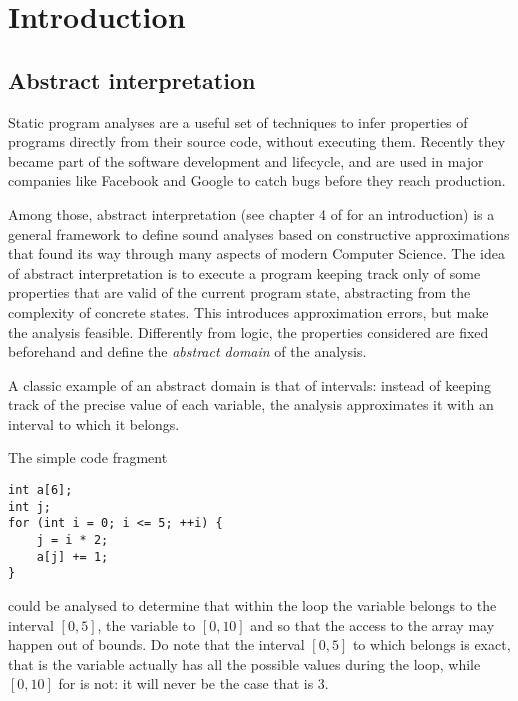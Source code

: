 \chapter{Introduction}

\section{Abstract interpretation}
Static program analyses are a useful set of techniques to infer properties of programs directly from their source code, without executing them. Recently they became part of the software development and lifecycle, and are used in major companies like Facebook \cite{distefano-static-analysis-fb} and Google \cite{static-analysis-google} to catch bugs before they reach production.

Among those, abstract interpretation \cite{cousot-77,cousot-79,cousot-92} (see chapter 4 of \cite{principles-of-program-analysis-book} for an introduction) is a general framework to define sound analyses based on constructive approximations that found its way through many aspects of modern Computer Science.
The idea of abstract interpretation is to execute a program keeping track only of some properties that are valid of the current program state, abstracting from the complexity of concrete states. This introduces approximation errors, but make the analysis feasible. Differently from logic, the properties considered are fixed beforehand and define the \textit{abstract domain} of the analysis.

\begin{example}[Intervals]\label{intr:ex:intervals}
	A classic example of an abstract domain is that of intervals: instead of keeping track of the precise value of each variable, the analysis approximates it with an interval to which it belongs.

	The simple code fragment
	\begin{verbatim}
int a[6];
int j;
for (int i = 0; i <= 5; ++i) {
	j = i * 2;
	a[j] += 1;
}
	\end{verbatim}
	could be analysed to determine that within the loop the variable  belongs to the interval $[0, 5]$, the variable  to $[0, 10]$ and so that the access to the array  may happen out of bounds.
	Do note that the interval $[0, 5]$ to which  belongs is exact, that is the variable actually has all the possible values during the loop, while $[0, 10]$ for  is not: it will never be the case that  is $3$.
\end{example}

